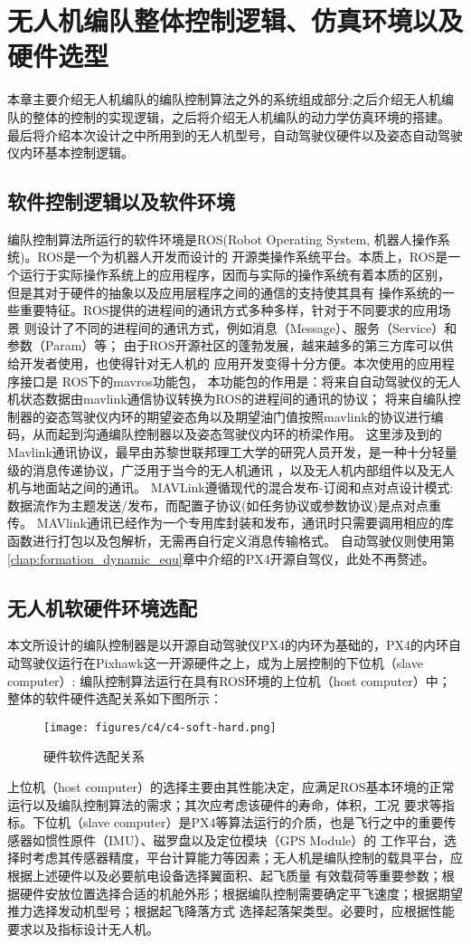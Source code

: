 \chapter{无人机编队整体控制逻辑、仿真环境以及硬件选型}
\label{chap:hardware}
本章主要介绍无人机编队的编队控制算法之外的系统组成部分;之后介绍无人机编队的整体的控制的实现逻辑，之后将介绍无人机编队的动力学仿真环境的搭建。
最后将介绍本次设计之中所用到的无人机型号，自动驾驶仪硬件以及姿态自动驾驶仪内环基本控制逻辑。
\section{ 软件控制逻辑以及软件环境 }
编队控制算法所运行的软件环境是ROS(Robot Operating System, 机器人操作系统)。ROS是一个为机器人开发而设计的
开源类操作系统平台。本质上，ROS是一个运行于实际操作系统上的应用程序，因而与实际的操作系统有着本质的区别，
但是其对于硬件的抽象以及应用层程序之间的通信的支持使其具有
操作系统的一些重要特征。ROS提供的进程间的通讯方式多种多样，针对于不同要求的应用场景
则设计了不同的进程间的通讯方式，例如消息（Message）、服务（Service）和参数（Param）等；
由于ROS开源社区的蓬勃发展，越来越多的第三方库可以供给开发者使用，也使得针对无人机的
应用开发变得十分方便。本次使用的应用程序接口是
ROS下的mavros功能包，
本功能包的作用是：将来自自动驾驶仪的无人机状态数据由mavlink通信协议转换为ROS的进程间的通讯的协议；
将来自编队控制器的姿态驾驶仪内环的期望姿态角以及期望油门值按照mavlink的协议进行编码，从而起到沟通编队控制器以及姿态驾驶仪内环的桥梁作用。
这里涉及到的Mavlink通讯协议，最早由苏黎世联邦理工大学的研究人员开发，是一种十分轻量级的消息传递协议，广泛用于当今的无人机通讯
，以及无人机内部组件以及无人机与地面站之间的通讯。
MAVLink遵循现代的混合发布-订阅和点对点设计模式:数据流作为主题发送/发布，而配置子协议(如任务协议或参数协议)是点对点重传。
MAVlink通讯已经作为一个专用库封装和发布，通讯时只需要调用相应的库函数进行打包以及包解析，无需再自行定义消息传输格式。
自动驾驶仪则使用第\ref{chap:formation_dynamic_equ}章中介绍的PX4开源自驾仪，此处不再赘述。
\section{无人机软硬件环境选配}
本文所设计的编队控制器是以开源自动驾驶仪PX4的内环为基础的，PX4的内环自动驾驶仪运行在Pixhawk这一开源硬件之上，成为上层控制的下位机（slave computer）:
编队控制算法运行在具有ROS环境的上位机（host computer）中；
整体的软件硬件选配关系如下图所示：
\begin{figure}[H]
    \centering
    \texttt{[image: figures/c4/c4-soft-hard.png]}
    \caption{硬件软件选配关系}\label{fig:c4-soft-hard.png}
\end{figure}
上位机（host computer）的选择主要由其性能决定，应满足ROS基本环境的正常运行以及编队控制算法的需求；其次应考虑该硬件的寿命，体积，工况
要求等指标。下位机（slave computer）是PX4等算法运行的介质，也是飞行之中的重要传感器如惯性原件（IMU）、磁罗盘以及定位模块（GPS Module）的
工作平台，选择时考虑其传感器精度，平台计算能力等因素；无人机是编队控制的载具平台，应根据上述硬件以及必要航电设备选择翼面积、起飞质量
有效载荷等重要参数；根据硬件安放位置选择合适的机舱外形；根据编队控制需要确定平飞速度；根据期望推力选择发动机型号；根据起飞降落方式
选择起落架类型。必要时，应根据性能要求以及指标设计无人机。

